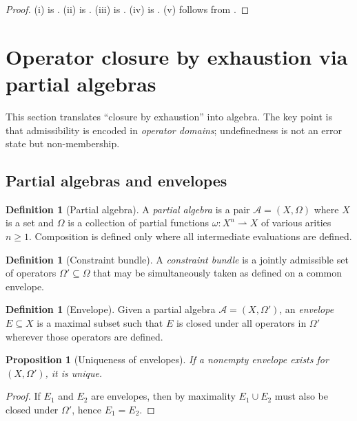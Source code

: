 \documentclass[11pt]{article}
\newtheorem{proposition}[theorem]{Proposition}
\theoremstyle{definition}
\newtheorem{definition}[theorem]{Definition}
\newcommand{\ppar}{\rightharpoonup} %
\begin{document}
\begin{proof}
(i) is . (ii) is .
(iii) is . (iv) is . (v) follows from .
\end{proof}

\section{Operator closure by exhaustion via partial algebras}
\label{sec:partial}

This section translates ``closure by exhaustion'' into algebra.
The key point is that admissibility is encoded in \emph{operator domains}; undefinedness is not an error state but non-membership.

\subsection{Partial algebras and envelopes}

\begin{definition}[Partial algebra]
A \emph{partial algebra} is a pair $\mathcal{A}=(X,\Omega)$ where $X$ is a set and $\Omega$ is a collection of partial functions $\omega: X^n\ppar X$ of various arities $n\ge 1$.
Composition is defined only where all intermediate evaluations are defined.
\end{definition}

\begin{definition}[Constraint bundle]
A \emph{constraint bundle} is a jointly admissible set of operators $\Omega'\subseteq\Omega$ that may be simultaneously taken as defined on a common envelope.
\end{definition}

\begin{definition}[Envelope]
Given a partial algebra $\mathcal{A}=(X,\Omega')$, an \emph{envelope} $E\subseteq X$ is a maximal subset such that $E$ is closed under all operators in $\Omega'$ wherever those operators are defined.
\end{definition}

\begin{proposition}[Uniqueness of envelopes]
\label{prop:unique-envelope}
If a nonempty envelope exists for $(X,\Omega')$, it is unique.
\end{proposition}

\begin{proof}
If $E_1$ and $E_2$ are envelopes, then by maximality $E_1\cup E_2$ must also be closed under $\Omega'$, hence $E_1=E_2$.
\end{proof}
\end{document}
